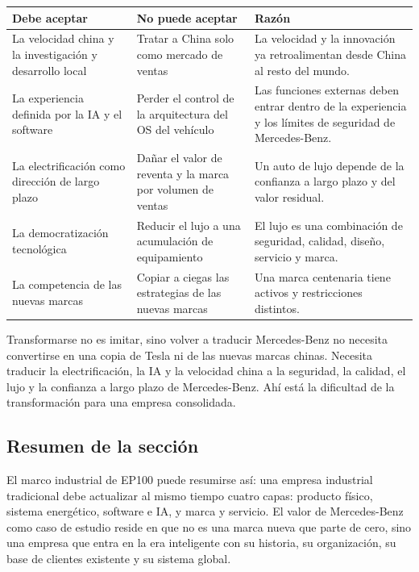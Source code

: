 \documentclass[a4paper]{article}
\begin{document}
\noindent\begin{tabularx}{\textwidth}{p{}p{}X}
\toprule
Debe aceptar & No puede aceptar & Razón \\
\midrule
La velocidad china y la investigación y desarrollo local & Tratar a China solo como mercado de ventas & La velocidad y la innovación ya retroalimentan desde China al resto del mundo. \\
La experiencia definida por la IA y el software & Perder el control de la arquitectura del OS del vehículo & Las funciones externas deben entrar dentro de la experiencia y los límites de seguridad de Mercedes-Benz. \\
La electrificación como dirección de largo plazo & Dañar el valor de reventa y la marca por volumen de ventas & Un auto de lujo depende de la confianza a largo plazo y del valor residual. \\
La democratización tecnológica & Reducir el lujo a una acumulación de equipamiento & El lujo es una combinación de seguridad, calidad, diseño, servicio y marca. \\
La competencia de las nuevas marcas & Copiar a ciegas las estrategias de las nuevas marcas & Una marca centenaria tiene activos y restricciones distintos. \\
\bottomrule
\end{tabularx}

\begin{importantbox}{Transformarse no es imitar, sino volver a traducir}
Mercedes-Benz no necesita convertirse en una copia de Tesla ni de las nuevas marcas chinas. Necesita traducir la electrificación, la IA y la velocidad china a la seguridad, la calidad, el lujo y la confianza a largo plazo de Mercedes-Benz. Ahí está la dificultad de la transformación para una empresa consolidada.
\end{importantbox}

\subsection{Resumen de la sección}

El marco industrial de EP100 puede resumirse así: una empresa industrial tradicional debe actualizar al mismo tiempo cuatro capas: producto físico, sistema energético, software e IA, y marca y servicio. El valor de Mercedes-Benz como caso de estudio reside en que no es una marca nueva que parte de cero, sino una empresa que entra en la era inteligente con su historia, su organización, su base de clientes existente y su sistema global.
\end{document}
